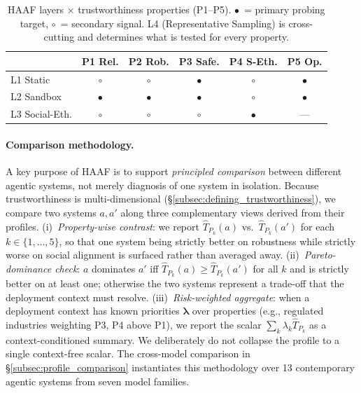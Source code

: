 \begin{table}[!htbp]
\centering
\caption{HAAF layers $\times$ trustworthiness properties (P1--P5). $\bullet$~= primary probing target, $\circ$~= secondary signal. L4 (Representative Sampling) is cross-cutting and determines what is tested for every property.}
\label{tab:layer_property}
\small
\setlength{\tabcolsep}{3pt}
\begin{tabular}{@{}lccccc@{}}
\toprule
& \textbf{P1 Rel.} & \textbf{P2 Rob.} & \textbf{P3 Safe.} & \textbf{P4 S-Eth.} & \textbf{P5 Op.} \\
\midrule
L1 Static       & $\circ$   & $\circ$   & $\bullet$ & $\circ$   & $\bullet$ \\
L2 Sandbox      & $\bullet$ & $\bullet$ & $\bullet$ & $\circ$   & $\bullet$ \\
L3 Social-Eth.  & $\circ$   & $\circ$   & $\circ$   & $\bullet$ & ---       \\
\bottomrule
\end{tabular}
\end{table}

\paragraph{Comparison methodology.}
A key purpose of HAAF is to support \emph{principled comparison} between different agentic systems, not merely diagnosis of one system in isolation. Because trustworthiness is multi-dimensional (\S\ref{subsec:defining_trustworthiness}), we compare two systems $a, a'$ along three complementary views derived from their profiles. (i)~\emph{Property-wise contrast}: we report $\hat T_{P_k}(a)$ vs.\ $\hat T_{P_k}(a')$ for each $k\in\{1,\dots,5\}$, so that one system being strictly better on robustness while strictly worse on social alignment is surfaced rather than averaged away. (ii)~\emph{Pareto-dominance check}: $a$ dominates $a'$ iff $\hat T_{P_k}(a) \ge \hat T_{P_k}(a')$ for all $k$ and is strictly better on at least one; otherwise the two systems represent a trade-off that the deployment context must resolve. (iii)~\emph{Risk-weighted aggregate}: when a deployment context has known priorities $\boldsymbol{\lambda}$ over properties (e.g., regulated industries weighting P3, P4 above P1), we report the scalar $\sum_k \lambda_k \hat T_{P_k}$ as a context-conditioned summary. We deliberately do not collapse the profile to a single context-free scalar. The cross-model comparison in \S\ref{subsec:profile_comparison} instantiates this methodology over 13 contemporary agentic systems from seven model families.

